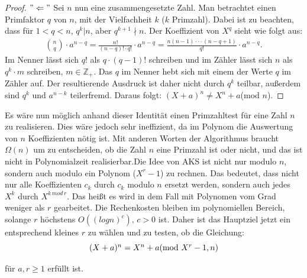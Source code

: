 \documentclass[12pt,oneside]{article}
\theoremstyle{remark}
\theoremstyle{definition}
\begin{document}
\begin{flushleft}
\begin{proof}
$"\Leftarrow"$\newline
Sei $n$ nun eine zusammengesetzte Zahl. Man betrachtet einen Primfaktor $q$ von $n$, mit der Vielfachheit $k$ ($k$ Primzahl). Dabei ist zu beachten, dass für $1 < q < n$, $q^k | n$, aber $q^{k+1} \nmid n$.\newline
Der Koeffizient von $X^q$ sieht wie folgt aus:\newline\smallskip
\begin{align*}
    {n \choose q} \cdot a^{n-q} = \frac{n!}{(n-q)! \cdot q!} \cdot a^{n-q} = \frac{n(n-1)\cdot \cdot \cdot (n-q+1)}{q!} \cdot a^{n-q}.
\end{align*}
\newline\newline
Im Nenner lässt sich $q!$ als $q \cdot (q-1)!$ schreiben und im Zähler lässt sich $n$ als $q^k\cdot m$ schreiben, $m \in \mathbb{Z}_{+}$. Das $q$ im Nenner hebt sich mit einem der Werte $q$ im Zähler auf. Der resultierende Ausdruck ist daher nicht durch $q^k$ teilbar, außerdem sind $q^k$ und $a^{n-k}$ teilerfremd. Daraus folgt: $(X + a)^n \neq X^n + a $(mod $n$).
\end{proof}

Es wäre nun möglich anhand dieser Identität einen Primzahltest für eine Zahl $n$ zu realisieren. Dies wäre jedoch sehr ineffizient, da im Polynom die Auswertung von $n$ Koeffizienten nötig ist. Mit anderen Worten der Algorithmus braucht $\Omega(n)$ um zu entscheiden, ob die Zahl $n$ eine Primzahl ist oder nicht, und das ist nicht in Polynomialzeit realisierbar.\newline\newline Die Idee von AKS ist nicht nur modulo $n$, sondern auch modulo ein Polynom ($X^r -1$) zu rechnen. Das bedeutet, dass  nicht nur alle Koeffizienten $c_{k}$ durch $c_{k}$ modulo $n$ ersetzt werden, sondern auch jedes $X^k$ durch $X^{k \, mod \, r}$. Das heißt es wird in dem Fall mit Polynomen vom Grad weniger als $r$ gearbeitet. Die Rechenkosten bleiben im polynomiellen Bereich, solange $r$ höchstens $O ((log n)^c), \, c > 0$ ist. Daher ist das Hauptziel jetzt ein entsprechend kleines $r$ zu wählen und zu testen, ob die Gleichung:\newline\newline
\begin{equation}\label{eq:2}
    \centerline{$(X + a)^n = X^n + a $(mod $X^r - 1, n$)}
\end{equation}

für $a,r \geq 1$ erfüllt ist.\newline


\end{flushleft}
\end{document}
